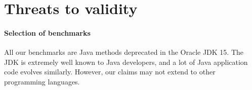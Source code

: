 \documentclass[sigconf]{acmart}
\begin{document}






\section{Threats to validity}

\paragraph{Selection of benchmarks}
%
All our benchmarks are Java methods deprecated in the Oracle JDK 15.
The JDK is extremely well known to Java developers, and a lot
of Java application code evolves similarly.
%
However, our claims may not extend to other programming languages.

\end{document}
